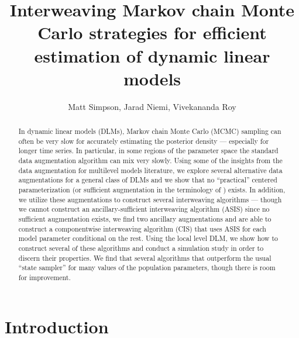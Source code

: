 \documentclass{article}
\begin{document}
\title{Interweaving Markov chain Monte Carlo strategies for efficient
estimation of dynamic linear models}
\author{Matt Simpson, Jarad Niemi, Vivekananda Roy}
\maketitle

\begin{abstract}
In dynamic linear models (DLMs), Markov chain Monte Carlo (MCMC) sampling can often be very slow for accurately estimating the posterior density --- especially for longer time series. In particular, in some regions of the parameter space the standard data augmentation algorithm can mix very slowly. Using some of the insights from the data augmentation for multilevel models literature, we explore several alternative data augmentations for a general class of DLMs and we show that no ``practical'' centered parameterization (or sufficient augmentation in the terminology of ) exists. In addition, we utilize these augmentations to construct several interweaving algorithms --- though we cannot construct an ancillary-sufficient interweaving algorithm (ASIS) since no sufficient augmentation exists, we find two ancillary augmentations and are able to construct a componentwise interweaving algorithm (CIS) that uses ASIS for each model parameter conditional on the rest. Using the local level DLM, we show how to construct several of these algorithms and conduct a simulation study in order to discern their properties. We find that several algorithms that outperform the usual ``state sampler'' for many values of the population parameters, though there is room for improvement.
\end{abstract}


\section{Introduction}\label{sec:Intro}
\end{document}
